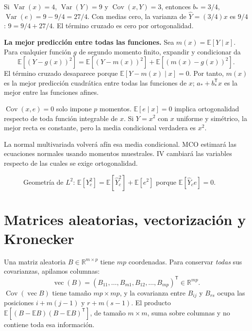 \documentclass[11pt,a4paper]{article}
\newcommand{\R}{\mathbb R}
\newcommand{\E}{\mathbb E}
\newcommand{\T}{^{\mathsf T}}
\DeclareMathOperator{\Var}{Var}
\DeclareMathOperator{\Cov}{Cov}
\DeclareMathOperator{\vecop}{vec}
\newcommand{\topic}[2]{\clearpage\section{#1}\label{#2}}
\theoremstyle{definition}\newtheorem{definicion}[teorema]{Definición}
\begin{document}
\begin{ejemplo}
Si $\Var(x)=4$, $\Var(Y)=9$ y $\Cov(x,Y)=3$, entonces
$b_*=3/4$, $\Var(e)=9-9/4=27/4$.
Con medias cero, la varianza de $\widehat Y=(3/4)x$ es $9/4$:
$9=9/4+27/4$. El término cruzado es cero por ortogonalidad.
\end{ejemplo}
\textbf{La mejor predicción entre todas las funciones.}
Sea $m(x)=\E[Y\mid x]$. Para cualquier función $g$ de segundo momento
finito, expandir y condicionar da
\[
\E[(Y-g(x))^2]
=\E[(Y-m(x))^2]+\E[(m(x)-g(x))^2].
\]
El término cruzado desaparece porque $\E[Y-m(x)\mid x]=0$.
Por tanto, $m(x)$ es la mejor predicción cuadrática entre todas las
funciones de $x$; $a_*+b_*\T x$ es la mejor entre las funciones afines.

\begin{cuidado}
$\Cov(x,e)=0$ solo impone $p$ momentos. $\E[e\mid x]=0$ implica
ortogonalidad respecto de toda función integrable de $x$.
Si $Y=x^2$ con $x$ uniforme y simétrico, la mejor recta es constante,
pero la media condicional verdadera es $x^2$.
\end{cuidado}
La normal multivariada volverá afín esa media condicional. MCO estimará
las ecuaciones normales usando momentos muestrales. IV cambiará
las variables respecto de las cuales se exige ortogonalidad.


\begin{figure}[H]\centering
{}
\caption{Geometría de $L^2$: $\E[Y_c^2]=\E[\widehat Y_c^2]+\E[e^2]$ porque $\E[\widehat Y_c e]=0$.}
\end{figure}
\topic{Matrices aleatorias, vectorización y Kronecker}{s18}
Una matriz aleatoria $B\in\R^{m\times p}$ tiene $mp$ coordenadas.
Para conservar \emph{todas} sus covarianzas, apilamos columnas:
\[
\vecop(B)=(B_{11},\ldots,B_{m1},B_{12},\ldots,B_{mp})\T\in\R^{mp}.
\]
$\Cov(\vecop B)$ tiene tamaño $mp\times mp$, y la covarianza entre
$B_{ij}$ y $B_{rs}$ ocupa las posiciones $i+m(j-1)$ y $r+m(s-1)$.
El producto $\E[(B-\E B)(B-\E B)\T]$, de tamaño $m\times m$,
suma sobre columnas y no contiene toda esa información.
\end{document}
